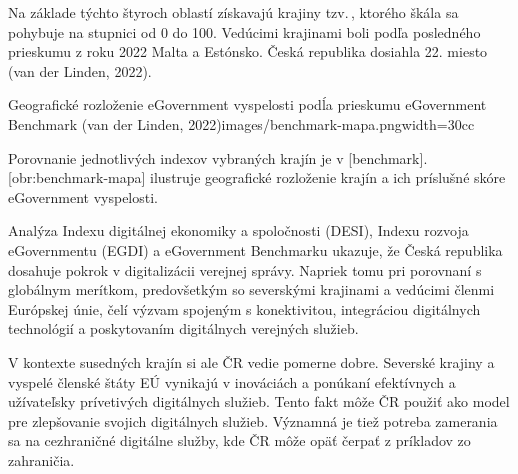 Na základe týchto štyroch oblastí získavajú krajiny tzv.\,, ktorého škála sa pohybuje na stupnici od 0 do 100. Vedúcimi krajinami boli podľa posledného prieskumu z roku 2022 Malta a Estónsko. Česká republika dosiahla 22. miesto \scr(van der Linden, 2022). 


\setupTABLE[frame=on]
\setupTABLE[row][first][background=color, backgroundcolor=lightgray, style=bold]
\setupTABLE[column][1][width=12cc]
\setupTABLE[column][2][width=6cc]
\setupTABLE[column][3][width=14cc]
\setupTABLE[r][each][align={middle,lohi}]


{Geografické rozloženie eGovernment vyspelosti podĺa prieskumu eGovernment Benchmark (van der Linden, 2022)}{images/benchmark-mapa.png}{width=30cc}

Porovnanie jednotlivých indexov vybraných krajín je v [benchmark]. [obr:benchmark-mapa] ilustruje geografické rozloženie krajín a ich príslušné skóre eGovernment vyspelosti.


Analýza Indexu digitálnej ekonomiky a spoločnosti (DESI), Indexu rozvoja eGovernmentu (EGDI) a eGovernment Benchmarku ukazuje, že Česká republika dosahuje pokrok v digitalizácii verejnej správy. Napriek tomu pri porovnaní s globálnym merítkom, predovšetkým so severskými krajinami a vedúcimi členmi Európskej únie, čelí výzvam spojeným s konektivitou, integráciou digitálnych technológií a poskytovaním digitálnych verejných služieb.

V kontexte susedných krajín si ale ČR vedie pomerne dobre. Severské krajiny a vyspelé členské štáty EÚ vynikajú v inováciách a ponúkaní efektívnych a užívateľsky prívetivých digitálnych služieb. Tento fakt môže ČR použiť ako model pre zlepšovanie svojich digitálnych služieb. Významná je tiež potreba zamerania sa na cezhraničné digitálne služby, kde ČR môže opäť čerpať z príkladov zo zahraničia.

